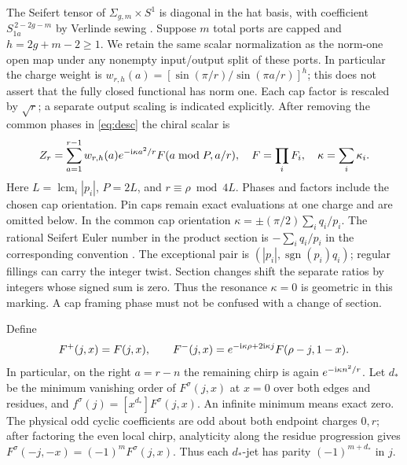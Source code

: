 \documentclass[11pt]{article}
\newcommand\ii{{\rm i}}
\newcommand\sgn{\operatorname{sgn}}
\begin{document}
The Seifert tensor of \(\Sigma_{g,m}\times S^1\) is diagonal in the hat basis, with coefficient \(S_{1a}^{\,2-2g-m}\) by Verlinde sewing \cite{Verlinde,Hansen}. Suppose \(m\) total ports are capped and \(h=2g+m-2\ge1\). We retain the same scalar normalization as the norm-one open map under any nonempty input/output split of these ports. In particular the charge weight is
\(w_{r,h}(a)=[\sin(\pi/r)/\sin(\pi a/r)]^h\); this does not assert that the fully closed functional has norm one. Each cap factor is rescaled by \(\sqrt r\); a separate output scaling is indicated explicitly. After removing the common phases in \eqref{eq:desc} the chiral scalar is
\begin{equation}\label{eq:z}
 Z_r=\sum_{a=1}^{r-1}w_{r,h}(a)e^{-\ii\kappa a^2/r}F(a\bmod P,a/r),
 \quad F=\prod_i F_i,\quad \kappa=\sum_i\kappa_i.
\end{equation}
Here \(L=\operatorname{lcm}_i|p_i|\), \(P=2L\), and \(r\equiv\rho\bmod4L\). Phases and factors include the chosen cap orientation. Pin caps remain exact evaluations at one charge and are omitted below. In the common cap orientation \(\kappa=\pm(\pi/2)\sum_i q_i/p_i\). The rational Seifert Euler number in the product section is \(-\sum_i q_i/p_i\) in the corresponding convention \cite[\S2]{Hansen}. The exceptional pair is \((|p_i|,\sgn(p_i)q_i)\); regular fillings can carry the integer twist. Section changes shift the separate ratios by integers whose signed sum is zero. Thus the resonance \(\kappa=0\) is geometric in this marking. A cap framing phase must not be confused with a change of section.

Define
\[
 F^+(j,x)=F(j,x),\qquad
 F^-(j,x)=e^{-\ii\kappa\rho+2\ii\kappa j}F(\rho-j,1-x).
\]
In particular, on the right \(a=r-n\) the remaining chirp is again \(e^{-\ii\kappa n^2/r}\). Let \(d_*\) be the minimum vanishing order of \(F^\sigma(j,x)\) at \(x=0\) over both edges and residues, and \(f^\sigma(j)=[x^{d_*}]F^\sigma(j,x)\). An infinite minimum means exact zero. The physical odd cyclic coefficients are odd about both endpoint charges \(0,r\); after factoring the even local chirp, analyticity along the residue progression gives \(F^\sigma(-j,-x)=(-1)^mF^\sigma(j,x)\). Thus each \(d_*\)-jet has parity \((-1)^{m+d_*}\) in \(j\).
\end{document}
